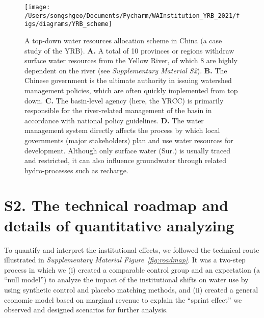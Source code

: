 \documentclass{article}
\begin{document}
\begin{figure}[!htb]
    \centering
	\texttt{[image: /Users/songshgeo/Documents/Pycharm/WAInstitution\_YRB\_2021/figs/diagrams/YRB\_scheme]}
	\caption{
		A top-down water resources allocation scheme in China (a case study of the YRB).
		\textbf{A.} A total of 10 provinces or regions withdraw surface water resources from the Yellow River, of which 8 are highly dependent on the river (see \textit{Supplementary Material S2}).
		\textbf{B.} The Chinese government is the ultimate authority in issuing watershed management policies, which are often quickly implemented from top down.
		\textbf{C.} The basin-level agency (here, the YRCC) is primarily responsible for the river-related management of the basin in accordance with national policy guidelines.
		\textbf{D.} The water management system directly affects the process by which local governments (major stakeholders) plan and use water resources for development. Although only surface water (Sur.) is usually traced and restricted, it can also influence groundwater through related hydro-processes such as recharge.
	}
	\label{fig:framework}
\end{figure}

\section*{S2. The technical roadmap and details of quantitative analyzing}
To quantify and interpret the institutional effects, we followed the technical route illustrated in \textit{Supplementary Material Figure~\ref{fig:roadmap}}. It was a two-step process in which we
(i) created a comparable control group and an expectation (a “null model”) to analyze the impact of the institutional shifts on water use by using synthetic control and placebo matching methods, and
(ii) created a general economic model based on marginal revenue to explain the “sprint effect” we observed and designed scenarios for further analysis.
\end{document}
